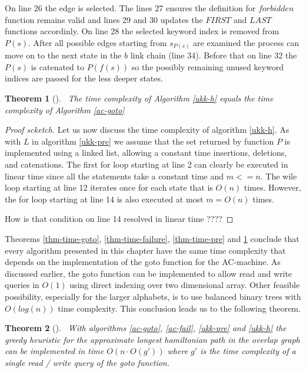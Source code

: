\documentclass[english,twoside,censored,csm,algorithms-track-2020]{HYthesisML}
\theoremstyle{plain}
\newtheorem{theorem}{Theorem}[chapter]
\theoremstyle{definition}
\begin{document}
On line 26 the edge is selected. The lines 27 ensures the definition for $forbidden$ function
remains valid and lines 29 and 30 updates the $FIRST$ and $LAST$ functions accordinly. On line
28 the selected keyword index is removed from $P(s)$. After all possible edges starting from
$s_{P(s)}$ are examined the process can move on to the next state in the $b$ link chain (line 34).
Before that on line 32 the $P(s)$ is catenated to $P(f(s))$ so the possibly remaining unused
keyword indices are passed for the less deeper states.




\begin{theorem}[]~\label{thm-time-h}
  The time complexity of Algorithm \ref{ukk-h} equals the time complexity of
  Algorithm \ref{ac-goto}
\end{theorem}
\begin{proof}[Proof scketch]

Let us now discuss the time complexity of algorithm \ref{ukk-h}. As with $L$ in algorithm \ref{ukk-pre}
we assume that the set returned by function $P$ is implemented using a linked list, allowing a constant
time insertions, deletions, and catenations. The first for loop starting at line 2 can clearly be
executed in linear time since all the statements take a constant time and $m <= n $. The wile loop
starting at line 12 iterates once for each state that is $O(n)$ times. However, the for loop starting
at line 14 is also executed at most $m = O(n)$ times.

How is that condition on line 14 resolved in linear time ????

\end{proof}

Theorems \ref{thm-time-goto}, \ref{thm-time-failure}, \ref{thm-time-pre} and \ref{thm-time-h}
conclude that every algorithm presented in this chapter have the same time complexity that depends
on the implementation of the goto function for the AC-machine. As discussed earlier, the goto function
can be implemented to allow read and write queries in  $O(1)$ using direct indexing over two
dimensional array. Other feasible possibility, especially for the larger alphabets, is to use balanced
binary trees with $O(log(n))$ time complexity. This conclusion leads us to the following theorem.

\begin{theorem}[]~\label{thm-overall-time}
  With algorithms \ref{ac-goto}, \ref{ac-fail}, \ref{ukk-pre} and \ref{ukk-h} the greedy heuristic
  for the approximate longest hamiltonian path in the overlap graph can be implemented in time
  $O(n \cdot O(g'))$ where $g'$ is the time complexity of a single read / write query of the
  goto function.
\end{theorem}
\end{document}
